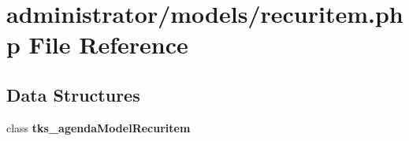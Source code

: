 \section{administrator/models/recuritem.php File Reference}
\label{models_2recuritem_8php}
\subsection*{Data Structures}
\begin{DoxyCompactItemize}
\item 
class \textbf{ tks\+\_\+agenda\+Model\+Recuritem}
\end{DoxyCompactItemize}
